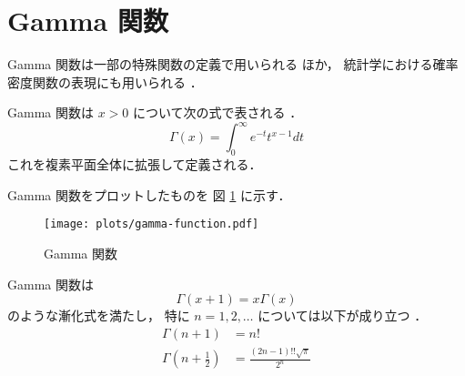 %

\section{Gamma 関数}\label{sec:special-function_gamma-function}

Gamma 関数は一部の特殊関数の定義で用いられる \cite{Kaneko1984} ほか，
統計学における確率密度関数の表現にも用いられる \cite{Berendsen2011}．

Gamma 関数は $x>0$ について次の式で表される
\cite[Section 4.5]{Morse1953}．
\begin{equation}
    \Gamma(x) = \int_0^\infty e^{-t} t^{x-1} dt
\end{equation}
これを複素平面全体に拡張して定義される．

Gamma 関数をプロットしたものを
図 \ref{fig:special-function_gamma-function} に示す．

\begin{figure}[tp]
    \centering
    \texttt{[image: plots/gamma-function.pdf]}
    \caption{Gamma 関数}
    \label{fig:special-function_gamma-function}
\end{figure}

Gamma 関数は
\begin{equation}
    \Gamma(x+1) = x \Gamma(x)
\end{equation}
のような漸化式を満たし，
特に $n = 1, 2, \ldots$ については以下が成り立つ
\cite[3 章]{Kaneko1984}．
\begin{align}
    \Gamma(n + 1)                      & = n!                                \\
    \Gamma\left(n + \frac{1}{2}\right) & = \frac{(2n - 1)!! \sqrt{\pi}}{2^n}
\end{align}
